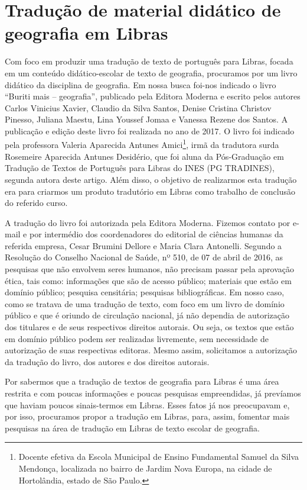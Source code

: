 \documentclass[portuguese]{textolivre}
\begin{document}
\section{Tradução de material didático de geografia em Libras}\label{sec-formato}
Com foco em produzir uma tradução de texto de português para Libras, focada em um conteúdo didático-escolar de texto de geografia, procuramos por um livro didático da disciplina de geografia. Em nossa busca foi-nos indicado o livro “Buriti mais – geografia”, publicado pela Editora Moderna e escrito pelos autores Carlos Vinicius Xavier, Claudio da Silva Santos, Denise Cristina Christov Pinesso, Juliana Maestu, Lina Youssef Jomaa e Vanessa Rezene dos Santos. A publicação e edição deste livro foi realizada no ano de 2017. O livro foi indicado pela professora Valeria Aparecida Antunes Amici\footnote{Docente efetiva da Escola Municipal de Ensino Fundamental Samuel da Silva Mendonça, localizada no bairro de Jardim Nova Europa, na cidade de Hortolândia, estado de São Paulo.}, irmã da tradutora surda Rosemeire Aparecida Antunes Desidério, que foi aluna da Pós-Graduação em Tradução de Textos de Português para Libras do INES (PG TRADINES), segunda autora deste artigo. Além disso, o objetivo de realizarmos esta tradução era para criarmos um produto tradutório em Libras como trabalho de conclusão do referido curso. 

A tradução do livro foi autorizada pela Editora Moderna. Fizemos contato por e-mail e por intermédio dos coordenadores do editorial de ciências humanas da referida empresa, Cesar Brumini Dellore e Maria Clara Antonelli. Segundo a Resolução do Conselho Nacional de Saúde, nº 510, de 07 de abril de 2016, as pesquisas que não envolvem seres humanos, não precisam passar pela aprovação ética, tais como: informações que são de acesso público; materiais que estão em domínio público; pesquisa censitária; pesquisas bibliográficas. Em nosso caso, como se tratava de uma tradução de texto, com foco em um livro de domínio público e que é oriundo de circulação nacional, já não dependia de autorização dos titulares e de seus respectivos direitos autorais. Ou seja, os textos que estão em domínio público podem ser realizadas livremente, sem necessidade de autorização de suas respectivas editoras. Mesmo assim, solicitamos a autorização da tradução do livro, dos autores e dos direitos autorais. 

Por sabermos que a tradução de textos de geografia para Libras é uma área restrita e com poucas informações e poucas pesquisas empreendidas, já prevíamos que haviam poucos sinais-termos em Libras. Esses fatos já nos preocupavam e, por isso, procuramos propor a tradução em Libras, para, assim, fomentar mais pesquisas na área de tradução em Libras de texto escolar de geografia.
\end{document}
